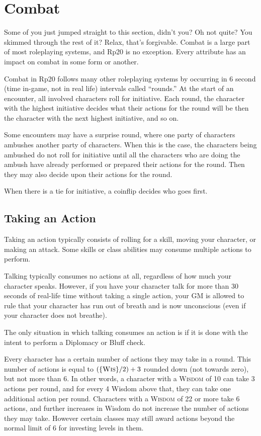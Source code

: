 \chapter{Combat}
Some of you just jumped straight to this section, didn’t you? Oh not quite? You skimmed through the rest of it? Relax, that’s forgivable. Combat is a large part of most roleplaying systems, and Rp20 is no exception. Every attribute has an impact on combat in some form or another.

Combat in Rp20 follows many other roleplaying systems by occurring in 6 second (time in-game, not in real life) intervals called ``rounds.'' At the start of an encounter, all involved characters roll for initiative. Each round, the character with the highest initiative decides what their actions for the round will be then the character with the next highest initiative, and so on.

Some encounters may have a surprise round, where one party of characters ambushes another party of characters. When this is the case, the characters being ambushed do not roll for initiative until all the characters who are doing the ambush have already performed or prepared their actions for the round. Then they may also decide upon their actions for the round.

When there is a tie for initiative, a coinflip decides who goes first.

\section{Taking an Action}
Taking an action typically consists of rolling for a skill, moving your character, or making an attack. Some skills or class abilities may consume multiple actions to perform.

Talking typically consumes no actions at all, regardless of how much your character speaks. However, if you have your character talk for more than 30 seconds of real-life time without taking a single action, your GM is allowed to rule that your character has run out of breath and is now unconscious (even if your character does not breathe).

The only situation in which talking consumes an action is if it is done with the intent to perform a Diplomacy or Bluff check.

Every character has a certain number of actions they may take in a round. This number of actions is equal to $(\{ \textsc{Wis} \}/2) + 3$ rounded down (not towards zero), but not more than 6. In other words, a character with a \textsc{Wisdom} of 10 can take 3 actions per round, and for every 4 Wisdom above that, they can take one additional action per round. Characters with a \textsc{Wisdom} of 22 or more take 6 actions, and further increases in Wisdom do not increase the number of actions they may take. However certain classes may still award actions beyond the normal limit of 6 for investing levels in them.

